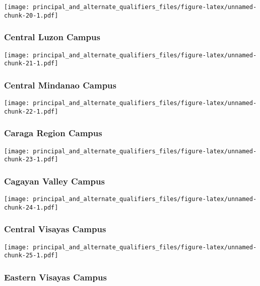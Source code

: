 \documentclass[]{article}
\begin{document}
\texttt{[image: principal\_and\_alternate\_qualifiers\_files/figure-latex/unnamed-chunk-20-1.pdf]}

\hypertarget{central-luzon-campus}{%
\subsubsection{Central Luzon Campus}\label{central-luzon-campus}}

\texttt{[image: principal\_and\_alternate\_qualifiers\_files/figure-latex/unnamed-chunk-21-1.pdf]}

\hypertarget{central-mindanao-campus}{%
\subsubsection{Central Mindanao Campus}\label{central-mindanao-campus}}

\texttt{[image: principal\_and\_alternate\_qualifiers\_files/figure-latex/unnamed-chunk-22-1.pdf]}

\hypertarget{caraga-region-campus}{%
\subsubsection{Caraga Region Campus}\label{caraga-region-campus}}

\texttt{[image: principal\_and\_alternate\_qualifiers\_files/figure-latex/unnamed-chunk-23-1.pdf]}

\hypertarget{cagayan-valley-campus}{%
\subsubsection{Cagayan Valley Campus}\label{cagayan-valley-campus}}

\texttt{[image: principal\_and\_alternate\_qualifiers\_files/figure-latex/unnamed-chunk-24-1.pdf]}

\hypertarget{central-visayas-campus}{%
\subsubsection{Central Visayas Campus}\label{central-visayas-campus}}

\texttt{[image: principal\_and\_alternate\_qualifiers\_files/figure-latex/unnamed-chunk-25-1.pdf]}

\hypertarget{eastern-visayas-campus}{%
\subsubsection{Eastern Visayas Campus}\label{eastern-visayas-campus}}
\end{document}
